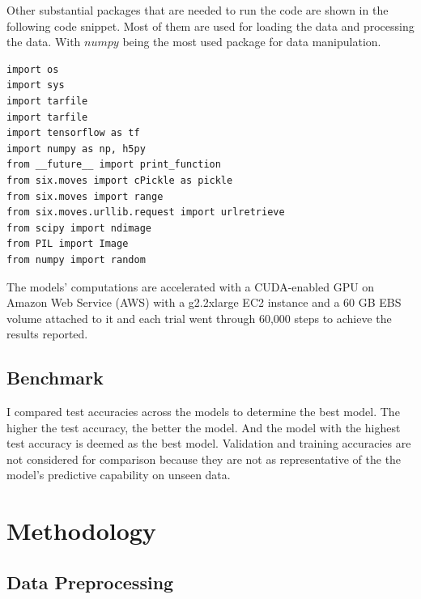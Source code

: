 \documentclass[twoside, column]{article}
\begin{document}
Other substantial packages that are needed to run the code are shown in the following code snippet. Most of them are used for loading the data and processing the data. With $numpy$ being the most used package for data manipulation.

\begin{verbatim}
import os
import sys
import tarfile
import tarfile
import tensorflow as tf
import numpy as np, h5py 
from __future__ import print_function
from six.moves import cPickle as pickle
from six.moves import range
from six.moves.urllib.request import urlretrieve
from scipy import ndimage
from PIL import Image
from numpy import random
 \end{verbatim}

The models' computations are accelerated with a CUDA-enabled GPU on Amazon Web Service (AWS) with a g2.2xlarge EC2 instance and a 60 GB EBS volume attached to it and each trial went through 60,000 steps to achieve the results reported. 



\subsection{Benchmark}

I compared test accuracies across the models to determine the best model. The higher the test accuracy, the better the model. And the model with the highest test accuracy is deemed as the best model. Validation and training accuracies are not considered for comparison because they are not as representative of the the model's predictive capability on unseen data. 


\section{Methodology}


\subsection{Data Preprocessing}
\end{document}
